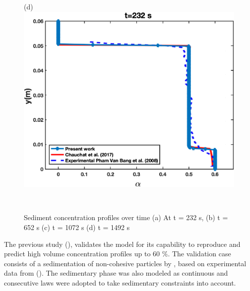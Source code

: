 \documentclass[review,3p,times,12pt]{elsarticle}
\begin{document}
\begin{minipage}[t]{0.5\textwidth}
\begin{figure}[H]
\begin{center}
(d)\includegraphics[scale = 0.45]{figs/E1}
\end{center}
\end{figure}
\end{minipage}\\
\begin{figure}[H]
\centering
\caption{Sediment concentration profiles over time (a) At t = 232 s, (b) t = 652 s (c) t = 1072 s (d) t = 1492 s}
\label{fig:laminar}
\end{figure}
The previous study (\citet{elkarii2020towards}), validates the model for its capability to reproduce and predict high volume concentration profiles up to 60 $\%$. The validation case consists of a sedimentation of non-cohesive particles by \citet{chauchat}, based on experimental data from (\citet{Pha-2008}). The sedimentary phase was also modeled as continuous and consecutive laws were adopted to take sedimentary constraints into account.
\end{document}
